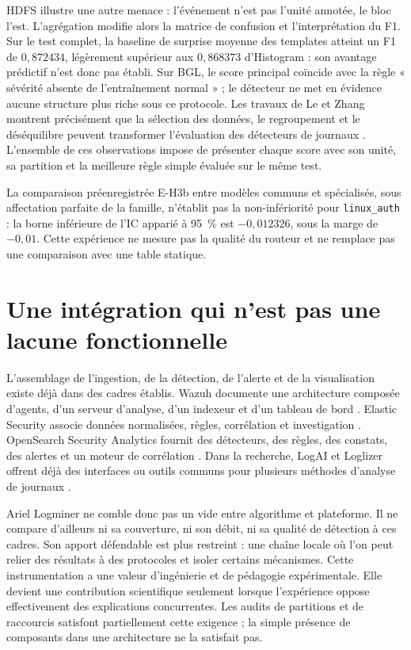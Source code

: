 HDFS illustre une autre menace : l'événement n'est pas l'unité annotée, le bloc l'est.
L'agrégation modifie alors la matrice de confusion et l'interprétation du F1. Sur le test
complet, la baseline de surprise moyenne des templates atteint un F1 de $0{,}872434$,
légèrement supérieur aux $0{,}868373$ d'Histogram : son avantage prédictif n'est donc pas
établi. Sur BGL, le score principal coïncide avec la règle « sévérité absente de l'entraînement normal » ; le
détecteur ne met en évidence aucune structure plus riche sous ce protocole. Les travaux
de Le et Zhang montrent précisément que la sélection des données, le regroupement et le
déséquilibre peuvent transformer l'évaluation des détecteurs de journaux
\cite{le2022logbased}. L'ensemble de ces observations impose de présenter chaque score
avec son unité, sa partition et la meilleure règle simple évaluée sur le même test.

La comparaison préenregistrée E-H3b entre modèles communs et spécialisés, sous
affectation parfaite de la famille, n'établit pas la non-infériorité pour
\texttt{linux\_auth} : la borne inférieure de l'IC apparié à 95~\% est
$-0{,}012326$, sous la marge de $-0{,}01$. Cette expérience ne mesure pas la qualité du
routeur et ne remplace pas une comparaison avec une table statique.

\section{Une intégration qui n'est pas une lacune fonctionnelle}

L'assemblage de l'ingestion, de la détection, de l'alerte et de la visualisation existe
déjà dans des cadres établis. Wazuh documente une architecture composée d'agents, d'un
serveur d'analyse, d'un indexeur et d'un tableau de bord
\cite{wazuh2026architecture}. Elastic Security associe données normalisées, règles,
corrélation et investigation \cite{elastic2026ecs,elastic2026security}. OpenSearch
Security Analytics fournit des détecteurs, des règles, des constats, des alertes et un
moteur de corrélation \cite{opensearch2026securityanalytics}. Dans la recherche, LogAI et
Loglizer offrent déjà des interfaces ou outils communs pour plusieurs méthodes d'analyse
de journaux \cite{cheng2023logai,he2016experience,logpai2026loglizer}.

Ariel Logminer ne comble donc pas un vide entre algorithme et plateforme. Il ne compare
d'ailleurs ni sa couverture, ni son débit, ni sa qualité de détection à ces cadres. Son
apport défendable est plus restreint : une chaîne locale où l'on peut relier des résultats
à des protocoles et isoler certains mécanismes. Cette instrumentation a une valeur
d'ingénierie et de pédagogie expérimentale. Elle devient une contribution scientifique
seulement lorsque l'expérience oppose effectivement des explications concurrentes. Les
audits de partitions et de raccourcis satisfont partiellement cette exigence ; la simple
présence de composants dans une architecture ne la satisfait pas.

